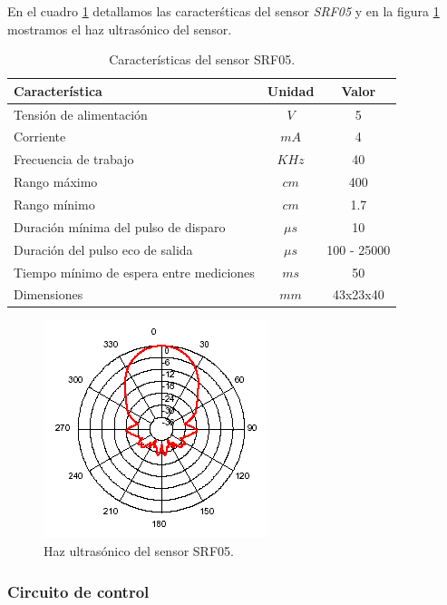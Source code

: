En el cuadro \ref{hT_srf05} detallamos las caracter\'sticas del sensor \emph{SRF05} y en la figura \ref{hF_srf05} mostramos el haz ultras\'onico
del sensor.

\begin{table}[ht]
	\begin{center}
		\begin{tabular}{|l|c|c|}
			\hline
			Caracter\'istica & Unidad & Valor\\
			\hline
			Tensi\'on de alimentaci\'on & $V$ & 5 \\
			Corriente & $mA$ & 4 \\
			Frecuencia de trabajo & $KHz$ & 40 \\
			Rango m\'aximo & $cm$ & 400 \\
			Rango m\'inimo & $cm$ & 1.7 \\
			Duraci\'on m\'inima del pulso de disparo & $\mu s$ & 10 \\
			Duraci\'on del pulso eco de salida & $\mu s$& 100 - 25000 \\
			Tiempo m\'inimo de espera entre mediciones & $m s$ & 50 \\
			Dimensiones & $mm$ & 43x23x40 \\
			\hline
		\end{tabular}
	\end{center}
	\caption{Caracter\'isticas del sensor SRF05.}
	\label{hT_srf05}
\end{table}

\begin{figure}[ht]
	\centering
	\includegraphics[scale=0.5]{figuras/srf05_beam.png}
	\caption{Haz ultras\'onico del sensor SRF05.}
	\label{hF_srf05}
\end{figure}

\subsubsection{Circuito de control}
\label{h_sensado_ultrasonido_circuito}

